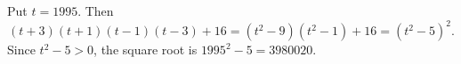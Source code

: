 Put $t=1995$. Then
\[
(t+3)(t+1)(t-1)(t-3)+16
=(t^2-9)(t^2-1)+16=(t^2-5)^2.
\]
Since $t^2-5>0$, the square root is $1995^2-5=\boxed{3980020}$.
